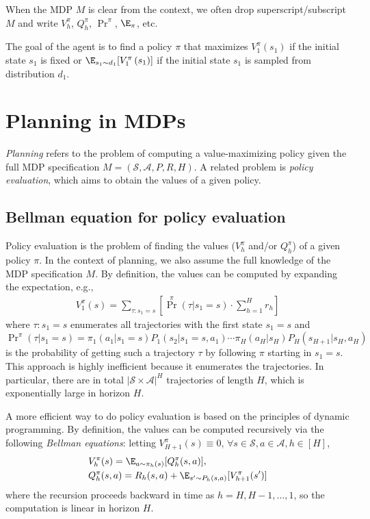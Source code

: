 When the MDP $M$ is clear from the context, we often drop superscript/subscript $M$ and write $V^\pi_h$, $Q^\pi_h$, $\Pr^{\pi}$, $\E_\pi$, etc.

The goal of the agent is to find a policy $\pi$ that maximizes $V_1^\pi\left(s_1\right)$ if the initial state $s_1$ is fixed or $\E_{s_1 \sim d_1} [V_1^\pi\left(s_1\right)]$ if the initial state $s_1$ is sampled from distribution $d_1$.

\section{Planning in MDPs}
{\em Planning} refers to the problem of computing a value-maximizing policy given the full MDP specification $M=(\mathcal{S},\mathcal{A}, P, R, H)$.
A related problem is {\em policy evaluation}, which aims to obtain the values of a given policy. 
\subsection{Bellman equation for policy evaluation}
Policy evaluation is the problem of finding the values ($V^\pi_h$ and/or $Q^\pi_h$) of a given policy $\pi$.
In the context of planning, we also assume the full knowledge of the MDP specification $M$.
By definition, the values can be computed by expanding the expectation, e.g., 
\begin{align*}
    V^\pi_1(s) = \sum_{\tau:s_1=s} \left[\textstyle\Pr^\pi(\tau|s_1=s)\cdot\sum_{h=1}^{H}r_h\right]
\end{align*}
where $\tau:s_1=s$ enumerates all trajectories with the first state $s_1=s$ and $\Pr^\pi(\tau|s_1=s)=\pi_1(a_1|s_1=s)P_1(s_2|s_1=s,a_1)\cdots\pi_H(a_H|s_H)P_H(s_{H+1}|s_H,a_H)$ is the probability of getting such a trajectory $\tau$ by following $\pi$ starting in $s_1=s$.
This approach is highly inefficient because it enumerates the trajectories. In particular, there are in total $|\mathcal{S}\times\mathcal{A}|^H$ trajectories of length $H$, which is exponentially large in horizon $H$.

A more efficient way to do policy evaluation is based on the principles of dynamic programming.
By definition, the values can be computed recursively via the following {\em Bellman equations}: letting $V^\pi_{H+1}(s)\equiv0$, $\forall s\in\mathcal{S},a\in\mathcal{A},h\in[H]$,
\begin{align}
\begin{split}\label{eq:Bellman}
& V_h^\pi(s)=\E_{a \sim \pi_h(s)} [Q_h^\pi(s, a)],\\
& Q_h^\pi(s, a)=R_h(s, a)+\E_{s' \sim P_h( s, a)}[V_{h+1}^\pi(s')]
\end{split}
\end{align}
where the recursion proceeds backward in time as $h=H,H-1,\ldots,1$, so the computation is linear in horizon $H$.

